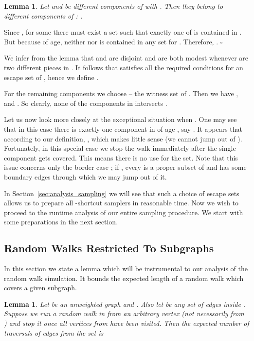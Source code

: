 \documentclass[11pt, letterpaper]{article}
\newtheorem{lemma}[theorem]{Lemma}
\newenvironment{proof}{\noindent{\bf Proof:}\hspace*{1em}}{\qed\bigskip}
\newcommand{\qed}{\hfill\ensuremath{\square}}
\begin{document}
\begin{lemma}
\label{lem:different_Pp_components}
Let  and  be different components of  with . Then they belong to different components of : .
\end{lemma}
\begin{proof}
Since , for some  there must exist a set  such that exactly one of  is contained in . But because of age, neither  nor  is contained in any set  for . Therefore, .
\end{proof}

We infer from the lemma that  and  are disjoint and are both modest whenever  are two different pieces in . It follows that  satisfies all the required conditions for an escape set of , hence we define . 

For the remaining components  we choose  -- the witness set of . Then we have ,  and . So clearly, none of the components in  intersects .

Let us now look more closely at the exceptional situation when . One may see that in this case there is exactly one component in  of age , say . It appears that according to our definition, , which makes little sense (we cannot jump out of ). Fortunately, in this special case we stop the walk immediately after the single component gets covered. This means there is no use for the  set. Note that this issue concerns only the border case ; if , every  is a proper subset of  and has some boundary edges through which we may jump out of it.

In Section~\ref{sec:analysis_sampling} we will see that such a choice of escape sets allows us to prepare all -shortcut samplers in reasonable time. Now we wish to proceed to the runtime analysis of our entire sampling procedure. We start with some preparations in the next section.

\subsection{Random Walks Restricted To Subgraphs} \label{sec:random_walks_restricted_to_subgraphs}

In this section we state a lemma which will be instrumental to our analysis of the random walk simulation. It bounds the expected length of a random walk which covers a given subgraph.

\begin{lemma} \label{lem:ultimate}
Let  be an unweighted graph and . Also let  be any set of edges inside . Suppose we run a random walk in  from an arbitrary vertex (not necessarily from ) and stop it once all vertices from  have been visited. Then the expected number of traversals of edges from the set  is 
\end{lemma}
\end{document}
